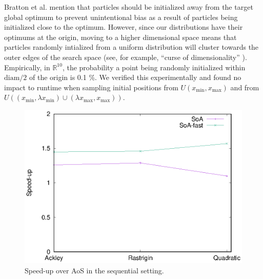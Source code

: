 Bratton et al. \cite{spso} mention that particles should be initialized away
from the target global optimum to prevent unintentional bias as a result of
particles being initialized close to the optimum. However, since our
distributions have their optimums at the origin, moving to a higher dimensional
space means that particles randomly intialized from a uniform distribution will
cluster towards the outer edges of the search space (see, for example, ``curse
of dimensionality'' \cite{hastie}). Empirically, in $\mathbb{R}^{10}$, the
probability a point being randomly initialized within $\text{diam}/2$ of the origin is 0.1 \%.
We verified this experimentally and found no
impact to runtime when sampling initial positions from $U(x_{\min}, x_{\max})$
and from $U((x_{\min},\lambda x_{\min})\cup(\lambda x_{\max}, x_{\max}))$.


\begin{figure}
  \includegraphics[width=\columnwidth]{../img/output/speedup_seq}
  \caption{Speed-up over AoS in the sequential setting.}\label{fig:seq-baseline}
\end{figure}

% 
% 

